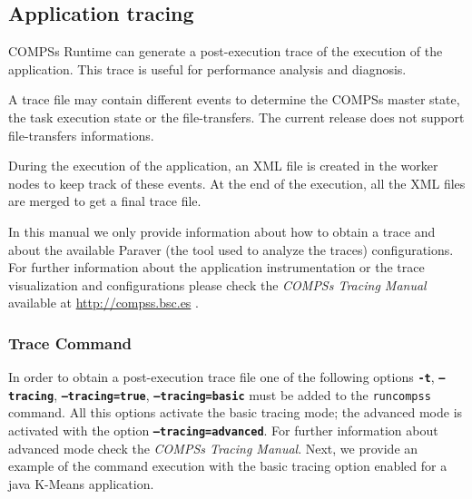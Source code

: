 \subsection{Application tracing}
\label{sec:Tracing}
COMPSs Runtime can generate a post-execution trace of the execution of the application. This trace is useful for
performance analysis and diagnosis.

A trace file may contain different events to determine the COMPSs master state, the task execution state or the file-transfers.
The current release does not support file-transfers informations.

During the execution of the application, an XML file is created in the worker nodes to keep track of 
these events. At the end of the execution, all the XML files are merged to get a final trace file.

In this manual we only provide information about how to obtain a trace and about the available Paraver (the tool used to analyze the traces) configurations. For further
information about the application instrumentation or the trace visualization and configurations please check the \textit{COMPSs Tracing Manual} 
available at \url{http://compss.bsc.es} .

\subsubsection{Trace Command}


In order to obtain a post-execution trace file one of the following options \texttt{\textbf{-t}}, \texttt{\textbf{--tracing}}, \texttt{\textbf{--tracing=true}}, \texttt{\textbf{--tracing=basic}} 
must be added to the \texttt{runcompss} command. All this options activate the basic tracing mode; the advanced mode is activated with the 
option \texttt{\textbf{--tracing=advanced}}. For further information about advanced mode check the \textit{COMPSs Tracing Manual}. Next, we
provide an example of the command execution with the basic tracing option enabled for a java K-Means application.

